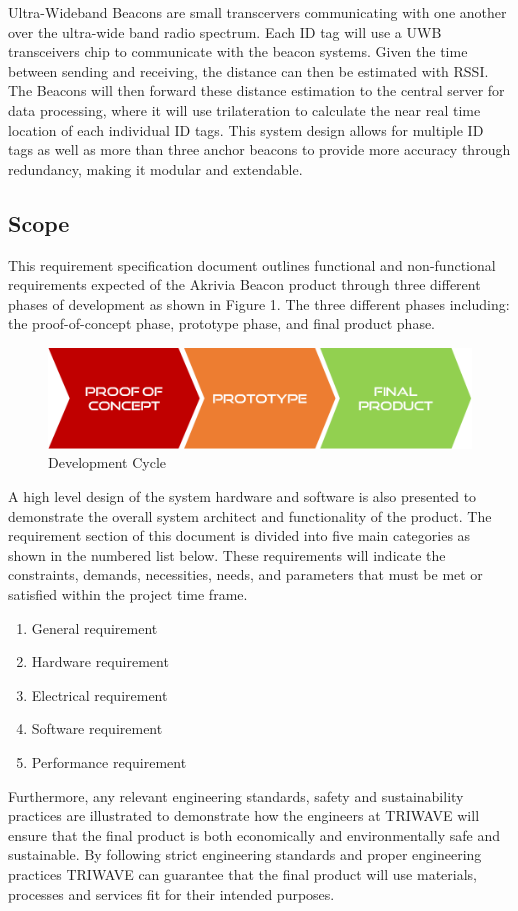\bigskip
Ultra-Wideband Beacons are small transcervers communicating with one another over the ultra-wide band radio spectrum. Each ID tag will use a UWB transceivers chip to communicate with the beacon systems. Given the time between sending and receiving, the distance can then be estimated with RSSI. The Beacons will then forward these distance estimation to the central server for data processing, where it will use trilateration to calculate the near real time location of each individual ID tags. This system design allows for multiple ID tags as well as more than three anchor beacons to provide more accuracy through redundancy, making it modular and extendable.

\break


\subsection{Scope}
This requirement specification document outlines functional and non-functional requirements expected of the Akrivia Beacon product through three different phases of development as shown in Figure 1. The three different phases  including: the proof-of-concept phase, prototype phase, and final product phase.
\medskip

\begin{figure}[H]
\centering
    \includegraphics[scale=0.4]{./images/dev-path.png}
    \caption{Development Cycle}
\end{figure}

A high level design of the system hardware and software is also presented to demonstrate the overall system architect and functionality of the product. The requirement section of this document is divided into five main categories as shown in the numbered list below. These requirements will indicate the constraints, demands, necessities, needs, and parameters that must be met or satisfied within the project time frame.

\begin{enumerate}
	\item General requirement 
	\item Hardware requirement 
	\item Electrical requirement 
	\item Software requirement 
	\item Performance requirement 
\end{enumerate}
\medskip
Furthermore, any relevant engineering standards, safety and sustainability practices are illustrated to demonstrate how the engineers at TRIWAVE will ensure that the final product is both economically and environmentally safe and sustainable. By following strict engineering standards and proper engineering practices TRIWAVE can guarantee that the final product will use materials, processes and services fit for their intended purposes.


